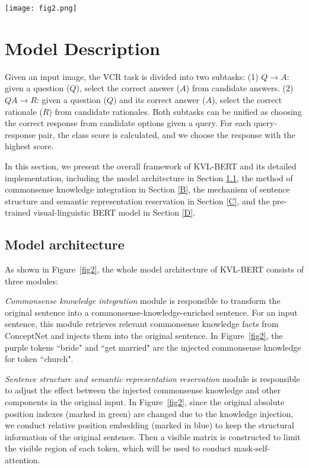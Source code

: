 \documentclass[conference]{IEEEtran}
\begin{document}
\begin{figure*}[t]
  \centering
  \texttt{[image: fig2.png]}\\
  \caption{The architecture of KVL-BERT.}
  \label{fig2}
\end{figure*}

\section{Model Description}

Given an input image, the VCR task is divided into two subtasks: (1) $Q \rightarrow A$: given a question ($Q$), select  the correct answer ($A$) from candidate answers. (2) $QA \rightarrow R$: given a question ($Q$) and its correct answer ($A$), select the correct rationale ($R$) from candidate rationales. Both subtasks can be unified as choosing the correct response from candidate options given a query. For each query-response pair, the class score is calculated, and we choose the response with the highest score.



In this section, we present the overall framework of KVL-BERT and its detailed implementation, including the model architecture in Section \ref{A},  the method of commonsense knowledge integration in Section \ref{B}, the mechanism of sentence structure and semantic representation reservation in Section \ref{C}, and the pre-trained visual-linguistic BERT model in Section \ref{D}.


\subsection{Model architecture}
\label{A}







As shown in Figure~\ref{fig2}, the whole model architecture of KVL-BERT consists of three modules:

\emph{Commonsense knowledge integration} module is responsible to transform the original sentence into a commonsense-knowledge-enriched sentence. For an input sentence, this module retrieves relevant commonsense knowledge facts from ConceptNet and injects them into the original sentence. In Figure~\ref{fig2}, the purple tokens “bride" and “get married" are the injected commonsense knowledge for token “church". 

\emph{Sentence structure and semantic representation reservation} module is responsible to adjust the effect between the injected commonsense knowledge and other components in the original input. In Figure~\ref{fig2}, since the original absolute position indexes (marked in green) are changed due to the knowledge injection, we conduct relative position embedding (marked in blue) to keep the structural information of the original sentence. Then a visible matrix is constructed to limit the visible region of each token, which will be used to conduct mask-self-attention.
\end{document}
